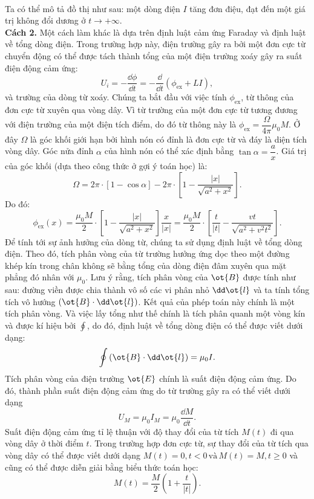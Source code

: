 \begin{loigiai}
\begin{enumerate}[1)]
\begin{center}
\begin{tikzpicture}[x=0.75pt,y=0.75pt,yscale=-1,xscale=1]
\end{tikzpicture}\\
\end{center}
Ta có thể mô tả đồ thị như sau: một dòng điện $I$ tăng đơn điệu, đạt đến một giá trị không đổi dương ở $t \rightarrow + \infty$.\\
\textbf{Cách 2.} Một cách làm khác là dựa trên định luật cảm ứng Faraday và định luật về tổng dòng điện. Trong trường hợp này, điện trường gây ra bởi một đơn cực từ chuyển động có thể được tách thành tổng của một điện trường xoáy gây ra suất điện động cảm ứng:
$$U_i = - \dfrac{\dd \phi}{\dd t} = - \dfrac{\dd}{\dd t}(\phi_{\text{ex}} + LI),$$
và trường của dòng từ xoáy. Chúng ta bắt đầu với việc tính $\phi_{\text{ex}}$, từ thông của đơn cực từ xuyên qua vòng dây. Vì từ trường của một đơn cực từ tương đương với điện trường của một điện tích điểm, do đó từ thông này là $\phi_{\text{ex}} = \dfrac{\Omega}{4\pi} \mu_0 M $. Ở đây $\Omega$ là góc khối giới hạn bởi hình nón có đỉnh là đơn cực từ và đáy là diện tích vòng dây. Góc nửa đỉnh $\alpha$ của hình nón có thể xác định bằng $\tan \alpha = \dfrac{a}{x}$. Giá trị của góc khối (dựa theo công thức ở gợi ý toán học) là:
   \[ \Omega = 2 \pi \cdot [1 - \cos \alpha ] - 2 \pi \cdot \left[ 1 - \dfrac{|x|}{\sqrt{a^2 + x^2}} \right].\]
Do đó:
    \[\phi_{\text{ex}}(x) = \dfrac{\mu_0 M}{2} \cdot \left[1 - \dfrac{|x|}{\sqrt{a^2 + x^2}}\right] \dfrac{x}{|x|} = \dfrac{\mu_0 M}{2} \cdot \left[ \dfrac{t}{|t|} - \dfrac{vt}{\sqrt{a^2 + v^2t^2}} \right].\]
Để tính tới sự ảnh hưởng của dòng từ, chúng ta sử dụng định luật về tổng dòng điện. Theo đó, tích phân vòng của từ trường hưởng ứng dọc theo một đường khép kín trong chân không sẽ bằng tổng của dòng điện đâm xuyên qua mặt phẳng đó nhân với $\mu_0$. Lưu ý rằng, tích phân vòng của $\ot{B}$ được tính như sau: đường viền được chia thành vô số các vi phân nhỏ $\dd \ot{l}$ và ta tính tổng tích vô hướng $(\ot{B} \cdot \dd \ot{l} )$. Kết quả của phép toán này chính là một tích phân vòng. Và việc lấy tổng như thế chính là tích phân quanh một vòng kín và được kí hiệu bởi $\oint$, do đó, định luật về tổng dòng điện có thể được viết dưới dạng:
$$\oint \left( \ot{B} \cdot \dd \ot{l} \right) = \mu_0 I.$$ 
Tích phân vòng của điện trường $\ot{E}$ chính là suất điện động cảm ứng. Do đó, thành phần suất điện động cảm ứng do từ trường gây ra có thể viết dưới dạng 
   \[  U_M = \mu_0 I_M = \mu_0 \dfrac{\dd M}{\dd t}.\]
Suất điện động cảm ứng tỉ lệ thuận với độ thay đổi của từ tích $M(t)$ đi qua vòng dây ở thời điểm $t$. Trong trường hợp đơn cực từ, sự thay đổi của từ tích qua vòng dây có thể được viết dưới dạng $M(t)=0, t<0 \,\text{và}\, M(t)=M, t \geq 0$ và cũng có thể được diễn giải bằng biểu thức toán học: 
   \[ M(t) = \dfrac{M}{2} \left(1 + \dfrac{t}{|t|} \right).\]


\end{enumerate}
\end{loigiai}
